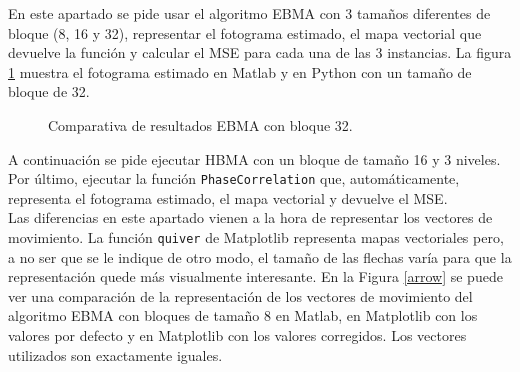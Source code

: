 \documentclass[a4paper,12pt]{report}
\begin{document}
En este apartado se pide usar el algoritmo EBMA con 3 tamaños diferentes de bloque (8, 16 y 32), representar el fotograma estimado, el mapa vectorial que devuelve la función y calcular el MSE para cada una de las 3 instancias. La figura \ref{ebma32} muestra el fotograma estimado en Matlab y en Python con un tamaño de bloque de 32.\\

\begin{figure}[!tbp]
  \centering
  \hfill
  \caption{Comparativa de resultados EBMA con bloque 32.}
  \label{ebma32}
\end{figure}
A continuación se pide ejecutar HBMA con un bloque de tamaño 16 y 3 niveles.\\

Por último, ejecutar la función \texttt{PhaseCorrelation} que, automáticamente, representa el fotograma estimado, el mapa vectorial y devuelve el MSE.\\

Las diferencias en este apartado vienen a la hora de representar los vectores de movimiento. La función \texttt{quiver} de Matplotlib representa mapas vectoriales pero, a no ser que se le indique de otro modo, el tamaño de las flechas varía para que la representación quede más visualmente interesante. En la Figura \ref{arrow} se puede ver una comparación de la representación  de los vectores de movimiento del algoritmo EBMA con bloques de tamaño 8 en Matlab, en Matplotlib con los valores por defecto y en Matplotlib con los valores corregidos. Los vectores utilizados son exactamente iguales.\\
\end{document}
